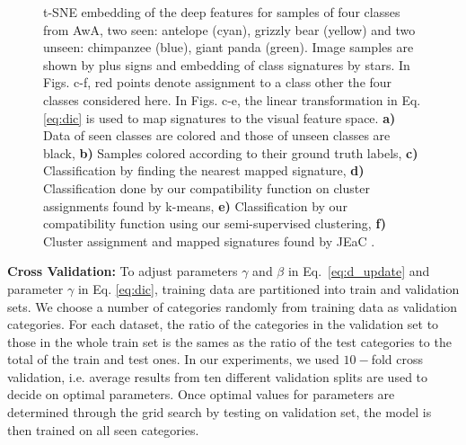 \documentclass[10pt,twocolumn,letterpaper]{article}
\begin{document}
\begin{figure}[t]
\begin{subfigure}[b]{0.25\linewidth}
  \end{subfigure}
  \caption{t-SNE embedding of the deep features for samples of four classes from AwA, two seen: antelope (cyan), grizzly bear (yellow) and two
  unseen: chimpanzee (blue), giant panda (green). Image samples are shown by plus signs and embedding of class signatures by stars.
  In Figs. c-f, red points denote assignment to a class other the four classes considered here. In Figs. c-e, the linear transformation in Eq. \eqref{eq:dic} is used to map signatures to the visual feature space.
  \textbf{a)} Data of seen classes are colored and those of unseen classes are black,
  \textbf{b)} Samples colored according to their ground truth labels,
  \textbf{c)} Classification by finding the nearest mapped signature,
  \textbf{d)} Classification done by our compatibility function on cluster assignments found by k-means,
  \textbf{e)} Classification by our compatibility function using our semi-supervised clustering,
  \textbf{f)} Cluster assignment and mapped signatures found by JEaC .
  }
  \label{fig:tsne}
\end{figure}


\textbf{Cross Validation:}
To adjust parameters $\gamma$ and $\beta$ in Eq.~\eqref{eq:d_update} and parameter $\gamma$ in Eq. \eqref{eq:dic},
 training data are partitioned into train and validation sets.
We choose a number of categories randomly from training data as validation categories. For each dataset, the ratio of the categories in the
validation set to those in the whole train set is the sames as the ratio of the test categories to the total of the train and test ones.
In our experiments, we used $10-$fold cross validation, i.e. average results from ten different validation splits are used to decide on
optimal parameters.
Once optimal values for parameters are determined through the grid search by testing on validation set, the model
is then trained on all seen categories.
\end{document}
